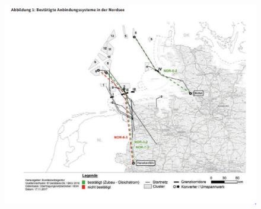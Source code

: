 \documentclass[aspectratio=1610, professionalfonts, 9pt]{beamer}
\begin{document}
{\begin{frame}
\begin{columns}
\begin{column}{0.6\textwidth}
\begin{figure}
      \includegraphics[width=1\textwidth]{images/HGU.PNG}
  \end{figure}
\end{column}
\end{columns}
\end{frame}
}
\end{document}
